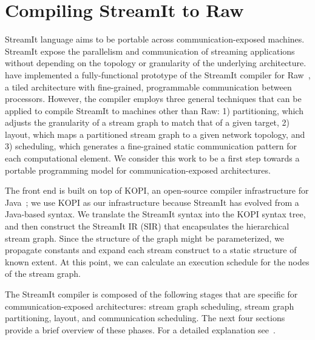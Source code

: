 \section{Compiling StreamIt to Raw}
\label{sec:phases}
StreamIt language aims to be portable across communication-exposed
machines.  StreamIt expose the parallelism and communication of
streaming applications without depending on the topology or
granularity of the underlying architecture.  have implemented a
fully-functional prototype of the StreamIt compiler for
Raw~\cite{raw}, a tiled architecture with fine-grained, programmable
communication between processors.  However, the compiler employs three
general techniques that can be applied to compile StreamIt to machines
other than Raw: 1) partitioning, which adjusts the granularity of a
stream graph to match that of a given target, 2) layout, which maps a
partitioned stream graph to a given network topology, and 3)
scheduling, which generates a fine-grained static communication
pattern for each computational element.  We consider this work to be a
first step towards a portable programming model for
communication-exposed architectures.

The front end is built on top of KOPI, an open-source compiler
infrastructure for Java~\cite{kopi}; we use KOPI as our infrastructure
because StreamIt has evolved from a Java-based syntax.  We translate
the StreamIt syntax into the KOPI syntax tree, and then construct the
StreamIt IR (SIR) that encapsulates the hierarchical stream graph.
Since the structure of the graph might be parameterized, we propagate
constants and expand each stream construct to a static structure of
known extent.  At this point, we can calculate an execution schedule
for the nodes of the stream graph.

The StreamIt compiler is composed of the following stages that are
specific for communication-exposed architectures: stream graph
scheduling, stream graph partitioning, layout, and communication
scheduling.  The next four sections provide a brief overview of these
phases. For a detailed explanation see~\cite{Gordo02,Gordon-thesis,Karczma-thesis}.

